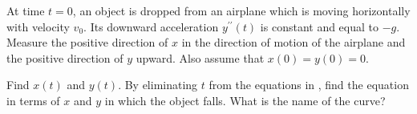 \begin{exercises}
At time $t = 0$, an object is dropped from an airplane
which is moving horizontally with velocity $v_0$.
Its downward acceleration $y^{\prime\prime}(t)$
is constant and equal to $-g$.
Measure the positive direction of $x$ in the direction
of motion of the airplane and the positive direction
of $y$ upward.  Also assume that
$x(0) = y(0) = 0$.
\begin{exenum}
\x
{}
Find $x(t)$ and $y(t)$.
\x
By eliminating $t$ from the equations in ,
find the equation in terms of $x$ and $y$ in which
the object falls.
What is the name of the curve?
\end{exenum}

\end{exercises}
